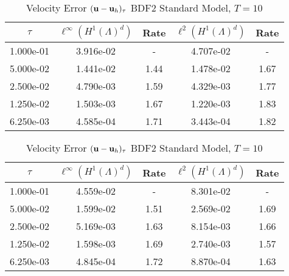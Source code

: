 \documentclass[letterpaper]{erdc}
\begin{document}
\begin{table}[h!]
  \parbox{.45\linewidth}{
  \tiny
  \centering
    \caption{Velocity Error $(\textbf{u} - \textbf{u}_h)_{\tau}$ BDF2 Rotational Model, $T=10$}
    \begin{tabular}{c|c|c|c|c}
      $\tau$ &  $\ell^{\infty}\left(H^1(\Lambda)^d\right)$ &  Rate  &  $\ell^2\left(H^1(\Lambda)^d\right)$  &  Rate\\
      \hline
      1.000e-01 & 3.916e-02 &  -   & 4.707e-02 &  -  \\
      5.000e-02 & 1.441e-02 & 1.44 & 1.478e-02 & 1.67\\
      2.500e-02 & 4.790e-03 & 1.59 & 4.329e-03 & 1.77\\
      1.250e-02 & 1.503e-03 & 1.67 & 1.220e-03 & 1.83\\
      6.250e-03 & 4.585e-04 & 1.71 & 3.443e-04 & 1.82
    \end{tabular}
    }
    \hfill
    \parbox{.45\linewidth}{
    \tiny
    \centering
      \caption{Velocity Error $(\textbf{u} - \textbf{u}_h)_{\tau}$ BDF2 Standard Model, $T=10$}
      \begin{tabular}{c|c|c|c|c}
        $\tau$ &  $\ell^{\infty}\left(H^1(\Lambda)^d\right)$ &  Rate  &  $\ell^2\left(H^1(\Lambda)^d\right)$  &  Rate\\
        \hline
        1.000e-01 & 4.559e-02 &   -  & 8.301e-02 &   - \\
        5.000e-02 & 1.599e-02 & 1.51 & 2.569e-02 & 1.69\\
        2.500e-02 & 5.169e-03 & 1.63 & 8.154e-03 & 1.66\\
        1.250e-02 & 1.598e-03 & 1.69 & 2.740e-03 & 1.57\\
        6.250e-03 & 4.845e-04 & 1.72 & 8.870e-04 & 1.63
      \end{tabular}\tiny
    }
\end{table}
\end{document}
